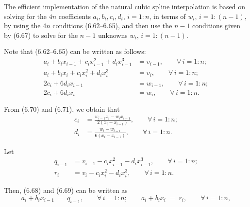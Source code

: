 The efficient implementation of the natural cubic spline interpolation is based on
solving for the $4n$ coefficients $a_i, b_i, c_i, d_i$, $i = 1:n$, in terms of $w_i$,
$i = 1:(n-1)$, by using the $4n$ conditions (6.62--6.65), and then use the $n-1$
conditions given by (6.67) to solve for the $n-1$ unknowns $w_i$, $i = 1:(n-1)$.

Note that (6.62--6.65) can be written as follows:
\begin{align}
a_i + b_ix_{i-1} + c_ix_{i-1}^2 + d_ix_{i-1}^3 &= v_{i-1}, \qquad \forall\, i = 1:n; \\
a_i + b_ix_i + c_ix_i^2 + d_ix_i^3 &= v_i, \qquad \forall\, i = 1:n; \\
2c_i + 6d_ix_{i-1} &= w_{i-1}, \qquad \forall\, i = 1:n; \\
2c_i + 6d_ix_i &= w_i, \qquad \forall\, i = 1:n.
\end{align}

From (6.70) and (6.71), we obtain that
\begin{align}
c_i &= \frac{w_{i-1}x_i - w_ix_{i-1}}{2(x_i-x_{i-1})}, \qquad \forall\, i = 1:n; \\
d_i &= \frac{w_i - w_{i-1}}{6(x_i-x_{i-1})}, \qquad \forall\, i = 1:n.
\end{align}

Let
\begin{align}
q_{i-1} &= v_{i-1} - c_ix_{i-1}^2 - d_ix_{i-1}^3, \qquad \forall\, i = 1:n; \\
r_i &= v_i - c_ix_i^2 - d_ix_i^3, \qquad \forall\, i = 1:n.
\end{align}

Then, (6.68) and (6.69) can be written as
\[
a_i + b_ix_{i-1} \;=\; q_{i-1}, \qquad \forall\, i = 1:n; \qquad a_i + b_ix_i \;=\; r_i,
\qquad \forall\, i = 1:n,
\]
